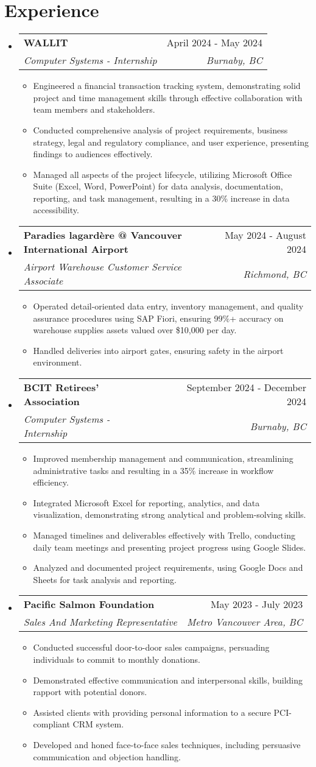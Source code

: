 \documentclass[letterpaper,11pt]{article}
\makeatletter
\newcommand{\resumeItem}[1]{
\item\small{
{#1 \vspace{-2pt}}
}
}
\newcommand{\resumeSubheading}[4]{
\vspace{-2pt}\item
\begin{tabular*}{0.97\textwidth}[t]{l@{\extracolsep{\fill}}r}
\textbf{#1} & #2 \\
\textit{\small#3} & \textit{\small #4} \\
\end{tabular*}\vspace{-7pt}
}
\newcommand{\resumeSubHeadingListStart}{\begin{itemize}[leftmargin=0.15in, label={}]}
\newcommand{\resumeSubHeadingListEnd}{\end{itemize}}
\newcommand{\resumeItemListStart}{\begin{itemize}}
\newcommand{\resumeItemListEnd}{\end{itemize}\vspace{-5pt}}
\makeatother
\begin{document}
\section{Experience}
\resumeSubHeadingListStart
\resumeSubheading{WALLIT}{April 2024 - May 2024}{Computer Systems - Internship}{Burnaby, BC}
\resumeItemListStart
\resumeItem{Engineered a financial transaction tracking system, demonstrating solid project and time management skills through effective collaboration with team members and stakeholders.}
\resumeItem{Conducted comprehensive analysis of project requirements, business strategy, legal and regulatory compliance, and user experience, presenting findings to audiences effectively.}
\resumeItem{Managed all aspects of the project lifecycle, utilizing Microsoft Office Suite (Excel, Word, PowerPoint) for data analysis, documentation, reporting, and task management, resulting in a 30\% increase in data accessibility.}
\resumeItemListEnd
\resumeSubheading{Paradies lagardère @ Vancouver International Airport}{May 2024 - August 2024}{Airport Warehouse Customer Service Associate}{Richmond, BC}
\resumeItemListStart
\resumeItem{Operated detail-oriented data entry, inventory management, and quality assurance procedures using SAP Fiori, ensuring 99\%+ accuracy on warehouse supplies assets valued over \$10,000 per day.}
\resumeItem{Handled deliveries into airport gates, ensuring safety in the airport environment.}
\resumeItemListEnd
\resumeSubheading{BCIT Retirees' Association}{September 2024 - December 2024}{Computer Systems - Internship}{Burnaby, BC}
\resumeItemListStart
\resumeItem{Improved membership management and communication, streamlining administrative tasks and resulting in a 35\% increase in workflow efficiency.}
\resumeItem{Integrated Microsoft Excel for reporting, analytics, and data visualization, demonstrating strong analytical and problem-solving skills.}
\resumeItem{Managed timelines and deliverables effectively with Trello, conducting daily team meetings and presenting project progress using Google Slides.}
\resumeItem{Analyzed and documented project requirements, using Google Docs and Sheets for task analysis and reporting.}
\resumeItemListEnd
\resumeSubheading{Pacific Salmon Foundation}{May 2023 - July 2023}{Sales And Marketing Representative}{Metro Vancouver Area, BC}
\resumeItemListStart
\resumeItem{Conducted successful door-to-door sales campaigns, persuading individuals to commit to monthly donations.}
\resumeItem{Demonstrated effective communication and interpersonal skills, building rapport with potential donors.}
\resumeItem{Assisted clients with providing personal information to a secure PCI-compliant CRM system.}
\resumeItem{Developed and honed face-to-face sales techniques, including persuasive communication and objection handling.}
\resumeItemListEnd
\resumeSubHeadingListEnd
\end{document}
